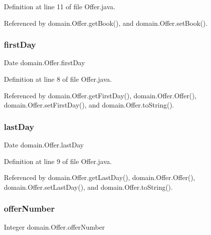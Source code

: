 Definition at line 11 of file Offer.\+java.



Referenced by domain.\+Offer.\+get\+Book(), and domain.\+Offer.\+set\+Book().

\mbox{\label{classdomain_1_1Offer_ac30c7d7ca38555fecc523259c15bd6b0}} 
\subsubsection{\texorpdfstring{firstDay}{firstDay}}
{\footnotesize\ttfamily Date domain.\+Offer.\+first\+Day\hspace{0.3cm}{\ttfamily [private]}}



Definition at line 8 of file Offer.\+java.



Referenced by domain.\+Offer.\+get\+First\+Day(), domain.\+Offer.\+Offer(), domain.\+Offer.\+set\+First\+Day(), and domain.\+Offer.\+to\+String().

\mbox{\label{classdomain_1_1Offer_a4d415274c0e120dd3e66e4ad46d7e2b2}} 
\subsubsection{\texorpdfstring{lastDay}{lastDay}}
{\footnotesize\ttfamily Date domain.\+Offer.\+last\+Day\hspace{0.3cm}{\ttfamily [private]}}



Definition at line 9 of file Offer.\+java.



Referenced by domain.\+Offer.\+get\+Last\+Day(), domain.\+Offer.\+Offer(), domain.\+Offer.\+set\+Last\+Day(), and domain.\+Offer.\+to\+String().

\mbox{\label{classdomain_1_1Offer_af77beec2989adcfb9b7b7ef399f9b363}} 
\subsubsection{\texorpdfstring{offerNumber}{offerNumber}}
{\footnotesize\ttfamily Integer domain.\+Offer.\+offer\+Number\hspace{0.3cm}{\ttfamily [private]}}



